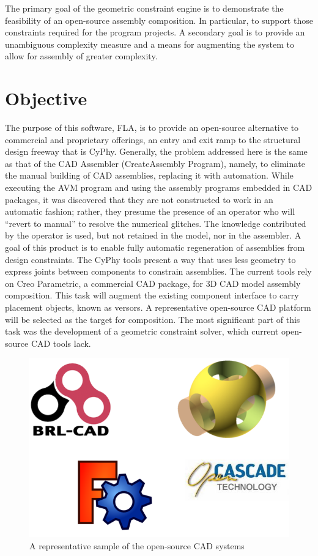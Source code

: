 \documentclass[]{report}
\begin{document}
The primary goal of the geometric constraint engine is to demonstrate the feasibility of an open-source assembly composition. In particular, to support those constraints required for the program projects. A secondary goal is to provide an unambiguous complexity measure and a means for augmenting the system to allow for assembly of greater complexity.

\section{Objective}

The purpose of this software, FLA,  is to provide an open-source alternative to commercial and proprietary offerings, 
an entry and exit ramp to the structural design freeway that is CyPhy.  
Generally, the problem addressed here is the same as that of the CAD Assembler (CreateAssembly Program),
namely, to eliminate the  manual building of CAD assemblies, replacing it with automation.
While executing the AVM program and using the assembly programs embedded in CAD packages, 
it was discovered that they are not constructed to work in an automatic fashion; rather, 
they presume the presence of an operator who will “revert to manual” to resolve the numerical glitches. 
The knowledge contributed by the operator is used, but not retained in the model, nor in the assembler. 
A goal of this product is to enable fully automatic regeneration of assemblies from design constraints.
The CyPhy tools present a way that uses less geometry to 
express joints between components to constrain assemblies. 
The current tools rely on Creo Parametric, a commercial CAD package, for 3D CAD model assembly composition. 
This task will augment the existing component interface to carry placement objects, known as versors. 
A representative open-source CAD platform will be selected as the target for composition. 
The most significant part of this task was the development of a geometric constraint solver, which current open-source CAD tools lack. 

\begin{figure}[h!]
	\centering
	\includegraphics[scale=0.7]{images/image11.png}
	\caption{A representative sample of the open-source CAD systems}
	\label{fig:foss-cad}
\end{figure}
\end{document}
